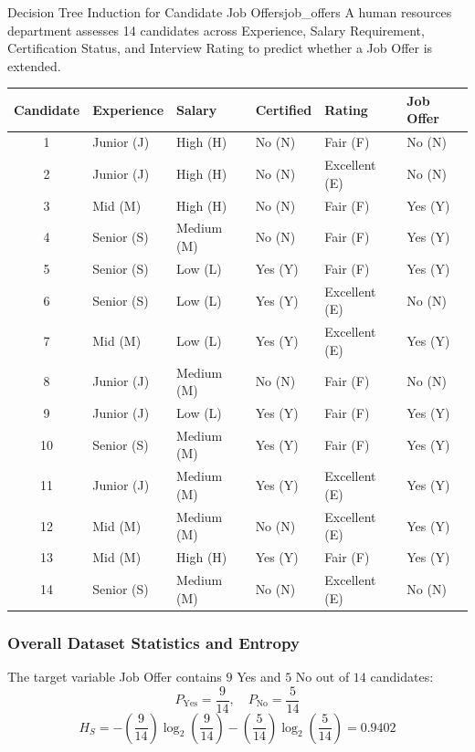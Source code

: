 \begin{example}{Decision Tree Induction for Candidate Job Offers}{job_offers}
A human resources department assesses 14 candidates across Experience, Salary Requirement, Certification Status, and Interview Rating to predict whether a Job Offer is extended.

\begin{center}\renewcommand{\arraystretch}{1.35}
\begin{tabular}{clllll}
\toprule
\textbf{Candidate} & \textbf{Experience} & \textbf{Salary} & \textbf{Certified} & \textbf{Rating} & \textbf{Job Offer} \\
\midrule
1  & Junior (J) & High (H)   & No (N)  & Fair (F)      & No (N) \\
2  & Junior (J) & High (H)   & No (N)  & Excellent (E) & No (N) \\
3  & Mid (M)    & High (H)   & No (N)  & Fair (F)      & Yes (Y) \\
4  & Senior (S) & Medium (M) & No (N)  & Fair (F)      & Yes (Y) \\
5  & Senior (S) & Low (L)    & Yes (Y) & Fair (F)      & Yes (Y) \\
6  & Senior (S) & Low (L)    & Yes (Y) & Excellent (E) & No (N) \\
7  & Mid (M)    & Low (L)    & Yes (Y) & Excellent (E) & Yes (Y) \\
8  & Junior (J) & Medium (M) & No (N)  & Fair (F)      & No (N) \\
9  & Junior (J) & Low (L)    & Yes (Y) & Fair (F)      & Yes (Y) \\
10 & Senior (S) & Medium (M) & Yes (Y) & Fair (F)      & Yes (Y) \\
11 & Junior (J) & Medium (M) & Yes (Y) & Excellent (E) & Yes (Y) \\
12 & Mid (M)    & Medium (M) & No (N)  & Excellent (E) & Yes (Y) \\
13 & Mid (M)    & High (H)   & Yes (Y) & Fair (F)      & Yes (Y) \\
14 & Senior (S) & Medium (M) & No (N)  & Excellent (E) & No (N) \\
\bottomrule
\end{tabular}
\end{center}

\subsubsection{Overall Dataset Statistics and Entropy}
The target variable Job Offer contains $9$ Yes and $5$ No out of $14$ candidates:
\begin{equation}
P_{\text{Yes}} = \frac{9}{14}, \quad P_{\text{No}} = \frac{5}{14}
\end{equation}
\begin{equation}
H_S = -\left(\frac{9}{14}\right)\log_2\left(\frac{9}{14}\right) - \left(\frac{5}{14}\right)\log_2\left(\frac{5}{14}\right) = 0.9402
\end{equation}


\end{example}
